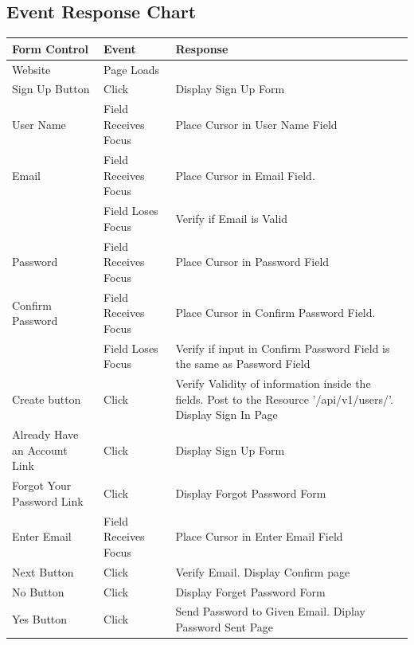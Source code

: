 \documentclass{report}
\begin{document}
\subsection{Event Response Chart}
\begin{center}
	\begin{tabular}{ m{1.5in} | m{1.5in} | m{1.5in} }	
	\textbf{Form Control} & \textbf{Event} & \textbf{Response} \\
	\hline
	Website 				& Page Loads 			& \\
	\hline
	Sign Up Button 		& Click 					& Display Sign Up Form \\
	\hline
	User Name 			& Field Receives Focus 	& Place Cursor in User Name Field \\
	\hline
	Email 				& Field Receives Focus 	& Place Cursor in Email Field. \\ \cline{2-3}
	      				& Field Loses Focus 		& Verify if Email is Valid \\
	\hline
	Password 			& Field Receives Focus 	& Place Cursor in Password Field \\
	\hline
	Confirm Password 	& Field Receives Focus 	& Place Cursor in Confirm Password Field. \\ \cline{2-3}
						& Field Loses Focus 		& Verify if input in Confirm Password Field is the same as Password Field \\
	\hline
	Create button 		& Click 					& Verify Validity of information inside the fields. Post to the Resource '/api/v1/users/'. Display Sign In Page  	\\
	\hline
	Already Have an Account Link & Click 			& Display Sign Up Form \\
	\hline
	Forgot Your Password Link & Click 			& Display Forgot Password Form \\
	\hline 	
	Enter Email 			& Field Receives Focus 	& Place Cursor in Enter Email Field \\
	\hline
	Next Button 			& Click 					& Verify Email. Display Confirm page \\
	\hline
	No Button 			& Click				 	& Display Forget Password Form \\
	\hline
	Yes Button 			& Click 					& Send Password to Given Email. Diplay Password Sent Page \\
	\end{tabular}
	\newpage
	

\end{center}
\end{document}
